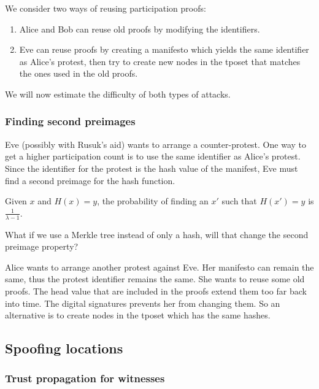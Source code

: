 We consider two ways of reusing participation proofs:
\begin{enumerate}
  \item Alice and Bob can reuse old proofs by modifying the identifiers.
  \item Eve can reuse proofs by creating a manifesto which yields the same 
    identifier as Alice's protest, then try to create new nodes in the 
    \ac{tposet} that matches the ones used in the old proofs.
\end{enumerate}
We will now estimate the difficulty of both types of attacks.

\subsubsection{Finding second preimages}

Eve (possibly with Rusuk's aid) wants to arrange a counter-protest.
One way to get a higher participation count is to use the same identifier as 
Alice's protest.
Since the identifier for the protest is the hash value of the manifest, Eve 
must find a second preimage for the hash function.

\begin{proposition}
  Given \(x\) and \(H(x) = y\), the probability of finding an \(x'\) such that 
  \(H(x') = y\) is \(\frac{1}{\lambda-1}\).
\end{proposition}

\begin{question}
  What if we use a Merkle tree instead of only a hash, will that change the 
  second preimage property?
\end{question}

Alice wants to arrange another protest against Eve.
Her manifesto can remain the same, thus the protest identifier remains the 
same.
She wants to reuse some old proofs.
The head value that are included in the proofs extend them too far back into 
time.
The digital signatures prevents her from changing them.
So an alternative is to create nodes in the \ac{tposet} which has the same 
hashes.

\subsection{Spoofing locations}

\subsubsection{Trust propagation for witnesses}

